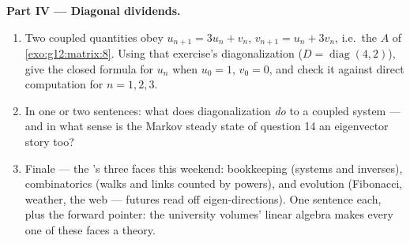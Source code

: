 \begin{problem}
\medskip
\noindent\textbf{Part IV --- Diagonal dividends.}
\begin{enumerate}[resume]
  \item Two coupled quantities obey
        $u_{n+1} = 3u_n + v_n$, $v_{n+1} = u_n + 3v_n$, i.e.\
        the  $A$ of \cref{exo:g12:matrix:8}. Using that
        exercise's diagonalization
        ($D = \operatorname{diag}(4, 2)$), give the closed
        formula for $u_n$ when $u_0 = 1$, $v_0 = 0$, and check
        it against direct computation for $n = 1, 2, 3$.
  \item In one or two sentences: what does diagonalization
        \emph{do} to a coupled system --- and in what sense is
        the Markov steady state of question 14 an eigenvector
        story too?
  \item Finale --- the 's three faces this weekend:
        bookkeeping (systems and inverses), combinatorics
        (walks and links counted by powers), and evolution
        (Fibonacci, weather, the web --- futures read off
        eigen-directions). One sentence each, plus the
        forward pointer: the university volumes' linear algebra
        makes every one of these faces a theory.
\end{enumerate}
\end{problem}

